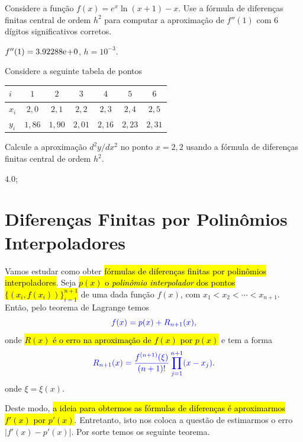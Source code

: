 \begin{exer}
  Considere a função $f(x) = e^x\ln(x+1) - x$. Use a fórmula de diferenças finitas central de ordem $h^2$ para computar a aproximação de $f''(1)$ com 6 dígitos significativos corretos.
\end{exer}
\begin{resp}
  $f''(1) = 3.92288\mathrm{e}\!+\!0$, $h=10^{-3}$.
\end{resp}


\begin{exer}\label{exer:d2fc_tab}
  Considere a seguinte tabela de pontos
  \begin{center}
    \begin{tabular}{l|cccccc}
      $i$ & $1$ & $2$ & $3$ & $4$ & $5$ & $6$ \\\hline
      $x_i$ & $2,0$ & $2,1$ & $2,2$ & $2,3$ & $2,4$ & $2,5$ \\
      $y_i$ & $1,86$ & $1,90$ & $2,01$ & $2,16$ & $2,23$ & $2,31$ \\\hline
    \end{tabular}
  \end{center}
Calcule a aproximação $d^2y/dx^2$ no ponto $x=2,2$ usando a fórmula de diferenças finitas central de ordem $h^2$.
\end{exer}
\begin{resp}
  $4.0$; 
\end{resp}


\section{Diferenças Finitas por Polinômios Interpoladores}\label{cap_deriv_sec_df_pi}

Vamos estudar como obter \hl{fórmulas de diferenças finitas por polinômios interpoladores}. Seja \hl{$p(x)$ o \emph{polinômio interpolador} dos pontos $\{(x_i,f(x_i))\}_{i=1}^{n+1}$} de uma dada função $f(x)$, com $x_1 < x_2 < \cdots < x_{n+1}$. Então, pelo teorema de Lagrange temos
\begin{equation}\color{blue}f(x) = p(x) + R_{n+1}(x),
\end{equation}
onde \hl{$R(x)$ é o erro na aproximação de $f(x)$ por $p(x)$} e tem a forma
\begin{equation}\color{blue}R_{n+1}(x) = \frac{f^{(n+1)}(\xi)}{(n+1)!}\prod_{j=1}^{n+1}(x-x_j).
\end{equation}
onde $\xi = \xi(x)$.

Deste modo, \hl{a ideia para obtermos as fórmulas de diferenças é aproximarmos $f'(x)$ por $p'(x)$}. Entretanto, isto nos coloca a questão de estimarmos o erro $|f'(x) - p'(x)|$. Por sorte temos os seguinte teorema.

